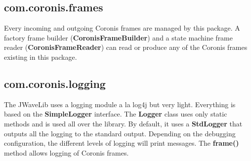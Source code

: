 \documentclass[a4paper,10pt,english]{sphinxmanual}
\begin{document}
\subsection{com.coronis.frames}
\label{technical_overview:com-coronis-frames}
Every incoming and outgoing Coronis frames are managed by this package. A factory frame builder (\textbf{CoronisFrameBuilder}) and a state machine frame reader (\textbf{CoronisFrameReader}) can read or produce any of the Coronis frames existing in this package.


\subsection{com.coronis.logging}
\label{technical_overview:com-coronis-logging}
The JWaveLib uses a logging module a la log4j but very light. Everything is based on the \textbf{SimpleLogger} interface. The \textbf{Logger} class uses only static methods and is used all over the library. By default, it uses a \textbf{StdLogger} that outputs all the logging to the standard output. Depending on the debugging configuration, the different levels of logging will print messages. The \textbf{frame()} method allows logging of Coronis frames.
\end{document}
